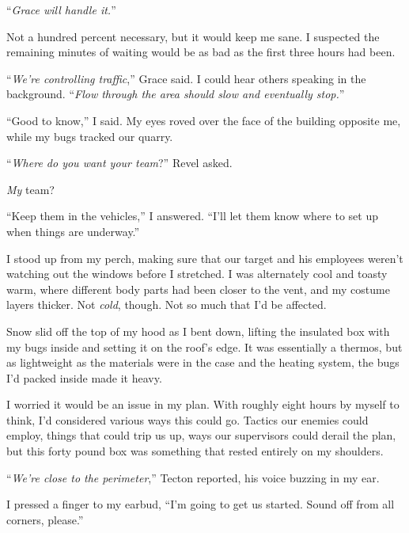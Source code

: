 ``\emph{Grace will handle it.}''



Not a hundred percent necessary, but it would keep me sane.  I suspected the remaining minutes of waiting would be as bad as the first three hours had been.



``\emph{We're controlling traffic},'' Grace said.  I could hear others speaking in the background.  ``\emph{Flow through the area should slow and eventually stop.}''



``Good to know,'' I said.  My eyes roved over the face of the building opposite me, while my bugs tracked our quarry.



``\emph{Where do you want your team}?''  Revel asked.



\emph{My} team?



``Keep them in the vehicles,'' I answered.  ``I'll let them know where to set up when things are underway.''



I stood up from my perch, making sure that our target and his employees weren't watching out the windows before I stretched.  I was alternately cool and toasty warm, where different body parts had been closer to the vent, and my costume layers thicker.  Not \emph{cold}, though.  Not so much that I'd be affected.



Snow slid off the top of my hood as I bent down, lifting the insulated box with my bugs inside and setting it on the roof's edge.  It was essentially a thermos, but as lightweight as the materials were in the case and the heating system, the bugs I'd packed inside made it heavy.



I worried it would be an issue in my plan.  With roughly eight hours by myself to think, I'd considered various ways this could go.  Tactics our enemies could employ, things that could trip us up, ways our supervisors could derail the plan, but this forty pound box was something that rested entirely on my shoulders.



``\emph{We're close to the perimeter},'' Tecton reported, his voice buzzing in my ear.



I pressed a finger to my earbud, ``I'm going to get us started.  Sound off from all corners, please.''



